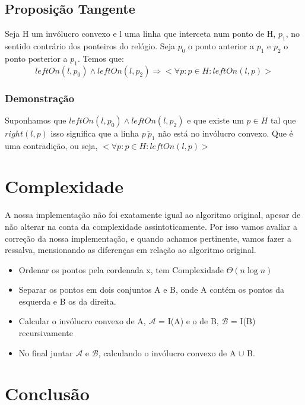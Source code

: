 \documentclass[11pt]{article}
\begin{document}
\subsection{Proposição Tangente}
Seja 
    H um invólucro convexo e 
    l uma linha que interceta num ponto de H, $p_1$,
no sentido contrário dos ponteiros do relógio.
Seja $p_0$ o ponto anterior a $p_1$ e $p_2$ o ponto posterior a $p_1$.
Temos que:
$$leftOn(l, p_0) \wedge leftOn(l, p_2) \Rightarrow
    <\forall p : p \in H : leftOn(l, p)>$$

\subsubsection{Demonstração}
Suponhamos que $leftOn(l, p_0) \wedge leftOn(l, p_2)$ 
e que existe um $p \in H$ tal que $right(l, p)$
isso significa que a linha $\overline{p\ p_1}$ não está no invólucro convexo.
Que é uma contradição, ou seja, $<\forall p : p \in H : leftOn(l, p)>$


\section{Complexidade}
A nossa implementação não foi exatamente igual ao algoritmo original,
apesar de não alterar na conta da complexidade assintoticamente.
Por isso vamos avaliar a correção da nossa implementação, e quando 
achamos pertinente, vamos fazer a ressalva, mensionando as diferenças 
em relação ao algoritmo original.

\begin{itemize}
    \item Ordenar os pontos pela cordenada x, tem Complexidade $\Theta(n\log{}n)$
    \item Separar os pontos em dois conjuntos A e B, onde A contém os pontos da esquerda e B os da direita.
    \item Calcular o invólucro convexo de A, $\mathcal{A}$ = I(A) e o de B, $\mathcal{B}$ = I(B) recursivamente
    \item No final juntar $\mathcal{A}$ e $\mathcal{B}$, calculando o invólucro convexo de A $\cup$ B.
\end{itemize}


\section{Conclusão}
\end{document}
